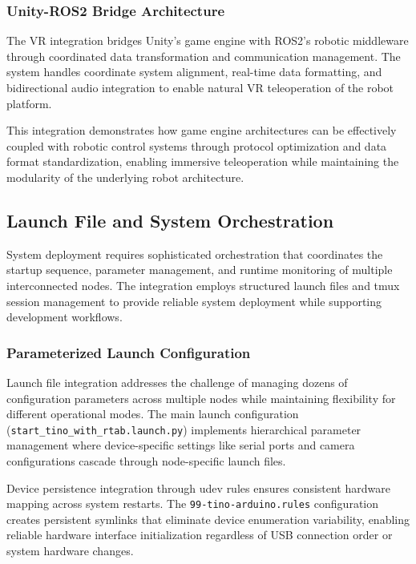 \subsubsection{Unity-ROS2 Bridge Architecture}

The VR integration bridges Unity's game engine with ROS2's robotic middleware through coordinated data transformation and communication management. The system handles coordinate system alignment, real-time data formatting, and bidirectional audio integration to enable natural VR teleoperation of the robot platform.

This integration demonstrates how game engine architectures can be effectively coupled with robotic control systems through protocol optimization and data format standardization, enabling immersive teleoperation while maintaining the modularity of the underlying robot architecture.

\subsection{Launch File and System Orchestration}

System deployment requires sophisticated orchestration that coordinates the startup sequence, parameter management, and runtime monitoring of multiple interconnected nodes. The integration employs structured launch files and tmux session management to provide reliable system deployment while supporting development workflows.

\subsubsection{Parameterized Launch Configuration}

Launch file integration addresses the challenge of managing dozens of configuration parameters across multiple nodes while maintaining flexibility for different operational modes. The main launch configuration (\texttt{start\_tino\_with\_rtab.launch.py}) implements hierarchical parameter management where device-specific settings like serial ports and camera configurations cascade through node-specific launch files.

Device persistence integration through udev rules ensures consistent hardware mapping across system restarts. The \texttt{99-tino-arduino.rules} configuration creates persistent symlinks that eliminate device enumeration variability, enabling reliable hardware interface initialization regardless of USB connection order or system hardware changes.

